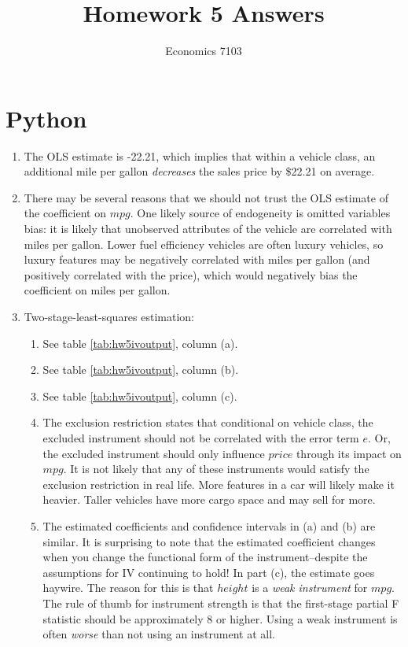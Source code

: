 \documentclass{article}
\title{Homework 5 Answers}
\author{Economics 7103}
\date{ }
\begin{document}
  
\maketitle

\section{Python}

\begin{enumerate}
    \item The OLS estimate is -22.21, which implies that within a vehicle class, an additional mile per gallon \textit{decreases} the sales price by \$22.21 on average.
    \item There may be several reasons that we should not trust the OLS estimate of the coefficient on $mpg$.  One likely source of endogeneity is omitted variables bias: it is likely that unobserved attributes of the vehicle are correlated with miles per gallon.  Lower fuel efficiency vehicles are often luxury vehicles, so luxury features may be negatively correlated with miles per gallon (and positively correlated with the price), which would negatively bias the coefficient on miles per gallon.
    \item Two-stage-least-squares estimation:
\begin{enumerate}[label=(\alph*)]
    \item See table \ref{tab:hw5ivoutput}, column (a).
    \item See table \ref{tab:hw5ivoutput}, column (b).
    \item See table \ref{tab:hw5ivoutput}, column (c).
    \item The exclusion restriction states that conditional on vehicle class, the excluded instrument should not be correlated with the error term $e$.  Or, the excluded instrument should only influence $price$ through its impact on $mpg$.  It is not likely that any of these instruments would satisfy the exclusion restriction in real life.  More features in a car will likely make it heavier.  Taller vehicles have more cargo space and may sell for more.
    \item The estimated coefficients and confidence intervals in (a) and (b) are similar.  It is surprising to note that the estimated coefficient changes when you change the functional form of the instrument--despite the assumptions for IV continuing to hold!  In part (c), the estimate goes haywire.  The reason for this is that $height$ is a \textit{weak instrument} for $mpg$.  The rule of thumb for instrument strength is that the first-stage partial F statistic should be approximately 8 or higher.  Using a weak instrument is often \textit{worse} than not using an instrument at all. 

\end{enumerate}
\end{enumerate}
\end{document}
